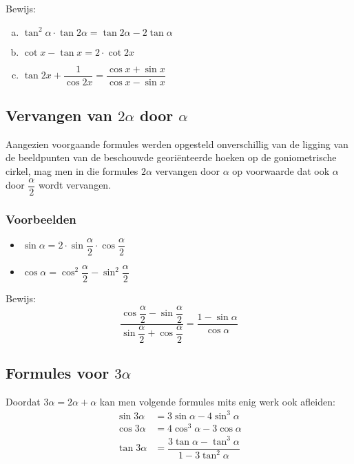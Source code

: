 \documentclass[twoside,a4paper,12pt]{article}
\begin{document}
\begin{oefening} %
Bewijs:
\begin{enumerate}[(a)]
  \itemsep.5em
  \item $\displaystyle \tan^2\alpha\cdot\tan 2\alpha=\tan 2\alpha - 2\tan\alpha$
  \item $\displaystyle \cot x - \tan x = 2\cdot\cot 2x$
  \item $\displaystyle \tan 2x + \dfrac{1}{\cos 2x} = \dfrac{\cos x + \sin x}{\cos x - \sin x}$
\end{enumerate}
\end{oefening}

\subsection{Vervangen van $2\alpha$ door $\alpha$}

Aangezien voorgaande formules werden opgesteld onverschillig van de ligging van de
beeldpunten van de beschouwde georiënteerde hoeken op de goniometrische cirkel,
mag men in die formules $2\alpha$ vervangen door $\alpha$ op voorwaarde dat ook
$\alpha$ door $\dfrac{\alpha}{2}$ wordt vervangen.

\subsubsection*{Voorbeelden}
\begin{itemize}
  \item $\sin\alpha = 2\cdot\sin\dfrac{\alpha}{2}\cdot\cos\dfrac{\alpha}{2}$
  \item $\cos\alpha = \cos^2\dfrac{\alpha}{2}-\sin^2\dfrac{\alpha}{2}$
\end{itemize}

\begin{oefening}
Bewijs:
$$\dfrac{\cos\dfrac{\alpha}{2}-\sin\dfrac{\alpha}{2}}{\sin\dfrac{\alpha}{2}+\cos\dfrac{\alpha}{2}}=\dfrac{1-\sin\alpha}{\cos\alpha}$$
\end{oefening}

\subsection{Formules voor $3\alpha$}

Doordat $3\alpha=2\alpha + \alpha$ kan men volgende formules mits enig werk ook afleiden:
\begin{align*}
  \sin 3\alpha &= 3\sin\alpha -4\sin^3\alpha\\
  \cos 3\alpha &= 4\cos^3\alpha -3\cos\alpha\\
  \tan 3\alpha &= \dfrac{3\tan\alpha -\tan^3\alpha}{1-3\tan^2\alpha}
\end{align*}
\end{document}
